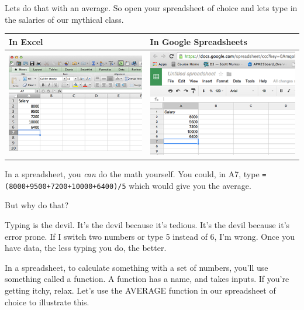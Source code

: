 \documentclass[]{book}
\begin{document}
Lets do that with an average. So open your spreadsheet of choice and lets type in the salaries of our mythical class.

\begin{longtable}[]{@{}ll@{}}
\toprule
In Excel & In Google Spreadsheets\tabularnewline
\midrule
\endhead
\includegraphics{images/excelmean1.png} & \includegraphics{images/googlemean1.png}\tabularnewline
\bottomrule
\end{longtable}

In a spreadsheet, you \emph{can} do the math yourself. You could, in A7, type \texttt{=(8000+9500+7200+10000+6400)/5} which would give you the average.

But why do that?

Typing is the devil. It's the devil because it's tedious. It's the devil because it's error prone. If I switch two numbers or type 5 instead of 6, I'm wrong. Once you have data, the less typing you do, the better.

In a spreadsheet, to calculate something with a set of numbers, you'll use something called a function. A function has a name, and takes inputs. If you're getting itchy, relax. Let's use the AVERAGE function in our spreadsheet of choice to illustrate this.
\end{document}
